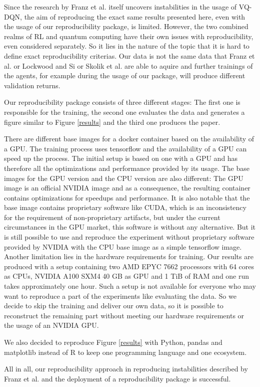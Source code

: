 Since the research by Franz et al. itself uncovers instabilities in the usage of \ac{VQ-DQN}, the aim of reproducing the exact same results presented here, even with the usage of our reproducibility package, is limited. 
However, the two combined realms of \ac{RL}\autocite{rlrepro} and quantum computing\autocite{quantumrepro} have their own issues with reproducibility, even considered separately. 
So it lies in the nature of the topic that it is hard to define exact reproducibility criterias.
Our data is not the same data that Franz et al. or Lockwood and Si or Skolik et al. are able to aquire and further trainings of the agents, for example during the usage of our package, will produce different validation returns.


Our reproducibility package consists of three different stages: The first one is responsible for the training, the second one evaluates the data and generates a figure similar to Figure \ref{results} and the third one produces the paper. 

There are different base images for a docker container based on the availability of a GPU. 
The training process uses tensorflow and the availability of a GPU can speed up the process. 
The initial setup is based on one with a GPU and has therefore all the optimizations and performance provided by its usage.
The base images for the GPU version and the CPU version are also different: The GPU image is an official NVIDIA image and as a consequence, the resulting container contains optimizations for speedups and performance. 
It is also notable that the base image contains proprietary software like CUDA, which is an inconsistency for the requirement of non-proprietary artifacts, but under the current circumstances in the GPU market, this software is without any alternative.
But it is still possible to use and reproduce the experiment without proprietary software provided by NVIDIA with the CPU base image as a simple tensorflow image.
Another limitation lies in the hardware requirements for training. 
Our results are produced with a setup containing two AMD EPYC 7662 processors with 64 cores as CPUs, NVIDIA A100 SXM4 40 GB as GPU and 1 TiB of RAM and one run takes approximately one hour. 
Such a setup is not available for everyone who may want to reproduce a part of the experiments like evaluating the data. 
So we decide to skip the training and deliver our own data, so it is possible to reconstruct the remaining part without meeting our hardware requirements or the usage of an NVIDIA GPU. 

We also decided to reproduce Figure \ref{results} with Python, pandas and matplotlib instead of R to keep one programming language and one ecosystem. 

All in all, our reproducibility approach in reproducing instabilities described by Franz et al. and the deployment of a reproducibility package is successful.

